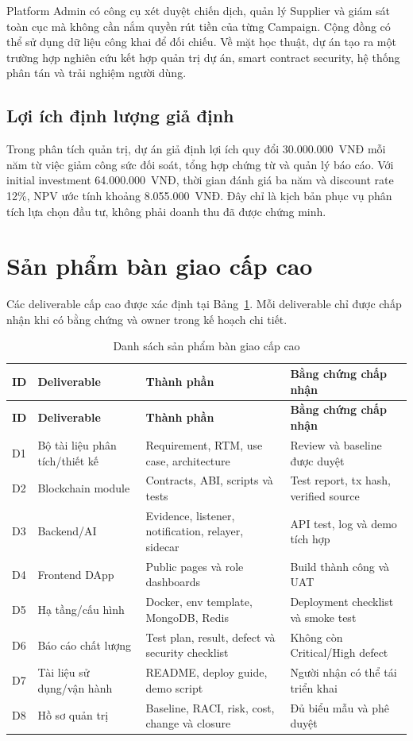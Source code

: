 Platform Admin có công cụ xét duyệt chiến dịch, quản lý Supplier và giám sát toàn cục mà không cần nắm quyền rút tiền của từng Campaign. Cộng đồng có thể sử dụng dữ liệu công khai để đối chiếu. Về mặt học thuật, dự án tạo ra một trường hợp nghiên cứu kết hợp quản trị dự án, smart contract security, hệ thống phân tán và trải nghiệm người dùng.

\subsection{Lợi ích định lượng giả định}

Trong phân tích quản trị, dự án giả định lợi ích quy đổi 30.000.000~VNĐ mỗi năm từ việc giảm công sức đối soát, tổng hợp chứng từ và quản lý báo cáo. Với initial investment 64.000.000~VNĐ, thời gian đánh giá ba năm và discount rate 12\%, NPV ước tính khoảng 8.055.000~VNĐ. Đây chỉ là kịch bản phục vụ phân tích lựa chọn đầu tư, không phải doanh thu đã được chứng minh.

\fi
\section{Sản phẩm bàn giao cấp cao}

Các deliverable cấp cao được xác định tại Bảng~\ref{tab:deliverables}. Mỗi deliverable chỉ được chấp nhận khi có bằng chứng và owner trong kế hoạch chi tiết.

\begin{longtable}{| p{1.1cm} | p{3.5cm} | p{4.6cm} | p{3.6cm} |}
\caption{Danh sách sản phẩm bàn giao cấp cao}\label{tab:deliverables}\\
\hline
\textbf{ID} & \textbf{Deliverable} & \textbf{Thành phần} & \textbf{Bằng chứng chấp nhận} \\
\hline
\endfirsthead
\hline
\textbf{ID} & \textbf{Deliverable} & \textbf{Thành phần} & \textbf{Bằng chứng chấp nhận} \\
\hline
\endhead
D1 & Bộ tài liệu phân tích/thiết kế & Requirement, RTM, use case, architecture & Review và baseline được duyệt \\ \hline
D2 & Blockchain module & Contracts, ABI, scripts và tests & Test report, tx hash, verified source \\ \hline
D3 & Backend/AI & Evidence, listener, notification, relayer, sidecar & API test, log và demo tích hợp \\ \hline
D4 & Frontend DApp & Public pages và role dashboards & Build thành công và UAT \\ \hline
D5 & Hạ tầng/cấu hình & Docker, env template, MongoDB, Redis & Deployment checklist và smoke test \\ \hline
D6 & Báo cáo chất lượng & Test plan, result, defect và security checklist & Không còn Critical/High defect \\ \hline
D7 & Tài liệu sử dụng/vận hành & README, deploy guide, demo script & Người nhận có thể tái triển khai \\ \hline
D8 & Hồ sơ quản trị & Baseline, RACI, risk, cost, change và closure & Đủ biểu mẫu và phê duyệt \\
\hline
\end{longtable}

